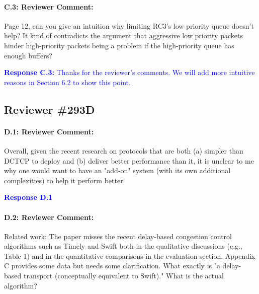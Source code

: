 \documentclass[12pt,one-column]{article}
\begin{document}
{\it \paragraph{C.3: Reviewer Comment:} Page 12, can you give an intuition why limiting RC3’s low priority queue doesn’t help? It kind of contradicts the argument that aggressive low priority packets hinder high-priority packets being a problem if the high-priority queue has enough buffers?}


\noindent\textcolor{blue}{\textbf{Response C.3:}
Thanks for the reviewer's comments. 
We will add more intuitive reasons in Section 6.2 to show this point.
}


\subsection{Reviewer \#293D}

{\it \paragraph{D.1: Reviewer Comment:}Overall, given the recent research on protocols that are both (a) simpler than DCTCP to deploy and (b) deliver better performance than it, it is unclear to me why one would want to have an "add-on" system (with its own additional complexities) to help it perform better.}

\noindent\textcolor{blue}{\textbf{Response D.1}
} 

{\it \paragraph{D.2: Reviewer Comment:}Related work: The paper misses the recent delay-based congestion control algorithms such as Timely and Swift both in the qualitative discussions (e.g., Table 1) and in the quantitative comparisons in the evaluation section. Appendix C provides some data but needs some clarification. What exactly is "a delay-based transport (conceptually equivalent to Swift)." What is the actual algorithm?}
\end{document}
